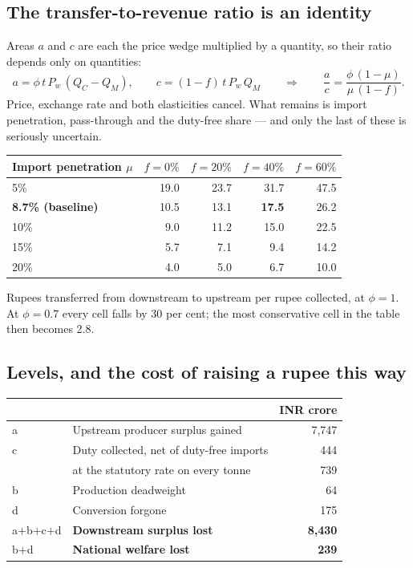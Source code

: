 \documentclass[11pt, a4paper]{article}
\begin{document}
\subsection{The transfer-to-revenue ratio is an identity}

Areas $a$ and $c$ are each the price wedge multiplied by a quantity, so their ratio
depends only on quantities:
\[
a = \phi\, t\, P_w\,(Q_C - Q_M), \qquad
c = (1-f)\, t\, P_w\, Q_M
\qquad\Longrightarrow\qquad
\frac{a}{c} = \frac{\phi\,(1-\mu)}{\mu\,(1-f)} .
\]
Price, exchange rate and both elasticities cancel. What remains is import
penetration, pass-through and the duty-free share --- and only the last of these is
seriously uncertain.

\begin{table}[H]
\centering
\small
\begin{tabular}{lrrrr}
\toprule
\textbf{Import penetration $\mu$} & \textbf{$f=0\%$} & \textbf{$f=20\%$} & \textbf{$f=40\%$} & \textbf{$f=60\%$} \\
\midrule
5\% & 19.0 & 23.7 & 31.7 & 47.5 \\
\textbf{8.7\% (baseline)} & 10.5 & 13.1 & \textbf{17.5} & 26.2 \\
10\% & 9.0 & 11.2 & 15.0 & 22.5 \\
15\% & 5.7 & 7.1 & 9.4 & 14.2 \\
20\% & 4.0 & 5.0 & 6.7 & 10.0 \\
\bottomrule
\end{tabular}

\vspace{0.15cm}
{\raggedright\footnotesize Rupees transferred from downstream to upstream per rupee
collected, at $\phi = 1$. At $\phi = 0.7$ every cell falls by 30 per cent; the most
conservative cell in the table then becomes 2.8.\par}
\end{table}

\subsection{Levels, and the cost of raising a rupee this way}

\begin{table}[H]
\centering
\small
\begin{tabular}{llr}
\toprule
& & \textbf{INR crore} \\
\midrule
a & Upstream producer surplus gained & 7{,}747 \\
c & Duty collected, net of duty-free imports & 444 \\
& \quad at the statutory rate on every tonne & 739 \\
b & Production deadweight & 64 \\
d & Conversion forgone & 175 \\
\midrule
a$+$b$+$c$+$d & \textbf{Downstream surplus lost} & \textbf{8{,}430} \\
b$+$d & \textbf{National welfare lost} & \textbf{239} \\
\bottomrule
\end{tabular}
\end{table}
\end{document}
